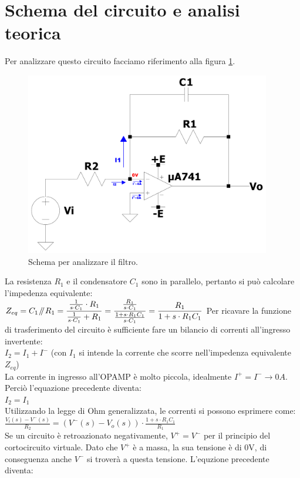 \documentclass{report}
\newcommand{\parallelsum}{\mathbin{\!/\mkern-5mu/\!}}
\begin{document}
\section{Schema del circuito e analisi teorica}
\noindent Per analizzare questo circuito facciamo riferimento alla figura \ref{figura:cto_analisi}.
\begin{figure}[h]
\centering
\includegraphics[height=8cm]{immagini/cto_filtro_analisi}
\caption{Schema per analizzare il filtro.}
\label{figura:cto_analisi}
\end{figure}
La resistenza $R_1$ e il condensatore $C_1$ sono in parallelo, pertanto si può calcolare l'impedenza equivalente:
\\[4pt]\indent$\displaystyle{Z_{eq}=C_1\parallelsum R_1=\frac{\frac{1}{s\cdot C_1} \cdot R_1}{\frac{1}{s\cdot C_1} + R_1}=\frac{\frac{R_1}{s\cdot C_1}}{\frac{1+s\cdot R_1C_1}{s\cdot C_1}}=\frac{R_1}{1+s\cdot R_1C_1}}$
\newpage \noindent Per ricavare la funzione di trasferimento del circuito è sufficiente fare un bilancio di correnti all'ingresso invertente: 
\\[2pt]\indent $I_2=I_1+I^-$ \indent (con $I_1$ si intende la corrente che scorre nell'impedenza equivalente $Z_{eq}$)
\\[2pt]La corrente in ingresso all'OPAMP è molto piccola, idealmente $I^+=I^-\rightarrow 0A$. Perciò l'equazione precedente diventa:
\\\indent $\displaystyle{I_2=I_1}$
\\Utilizzando la legge di Ohm generalizzata, le correnti si possono esprimere come:
\\[2pt]\indent $\displaystyle{\frac{V_i(s)-V^-(s)}{R_2}=(V^-(s)-V_o(s))\cdot\frac{1+s\cdot R_1C_1}{R_1}}$
\\[2pt]Se un circuito è retroazionato negativamente, $V^+=V^-$ per il principio del cortocircuito virtuale. Dato che $V^+$ è a massa, la sua tensione è di 0V, di conseguenza anche $V^-$ si troverà a questa tensione. L'equzione precedente diventa:
\end{document}
